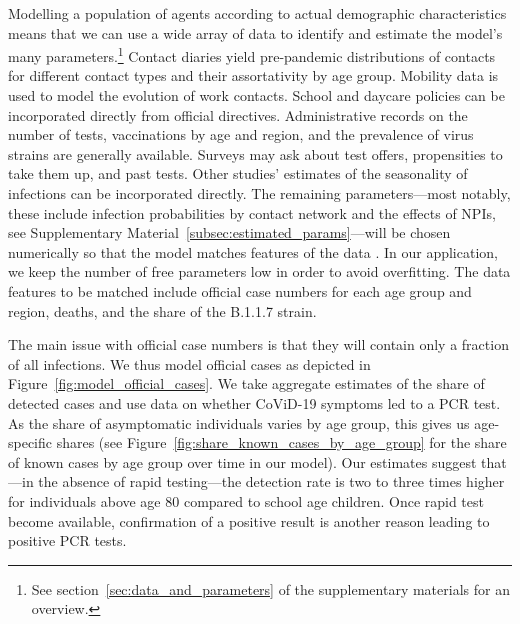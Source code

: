 Modelling a population of agents according to actual demographic characteristics means
that we can use a wide array of data to identify and estimate the model's many
parameters.\footnote{See section~\ref{sec:data_and_parameters} of the supplementary
materials for an overview.} Contact diaries yield pre-pandemic distributions of contacts
for different contact types and their assortativity by age group. Mobility data is used
to model the evolution of work contacts. School and daycare policies can be incorporated
directly from official directives. Administrative records on the number of tests,
vaccinations by age and region, and the prevalence of virus strains are generally
available. Surveys may ask about test offers, propensities to take them up, and past
tests. Other studies' estimates of the seasonality of infections can be incorporated
directly. The remaining parameters---most notably, these include infection probabilities
by contact network and the effects of NPIs, see Supplementary
Material~\ref{subsec:estimated_params}---will be chosen numerically so that the model
matches features of the data \citep[see][for the general method, also described in
Supplementary Material \ref{sec:model}]{McFadden1989}. In our application, we keep the number of free
parameters low in order to avoid overfitting. The data features to be matched include
official case numbers for each age group and region, deaths, and the share of the B.1.1.7
strain.

The main issue with official case numbers is that they will contain only a fraction of
all infections. We thus model official cases as depicted in
Figure~\ref{fig:model_official_cases}. We take aggregate
estimates of the share of detected cases and use data on whether CoViD-19 symptoms led to
a PCR test. As the share of asymptomatic individuals varies by age group, this gives us
age-specific shares (see Figure~\ref{fig:share_known_cases_by_age_group} for the share of
known cases by age group over time in our model). Our estimates suggest that---in the
absence of rapid testing---the detection rate is two to three times higher for
individuals above age 80 compared to school age children. Once rapid test become available, confirmation of a positive
result is another reason leading to positive PCR tests.

